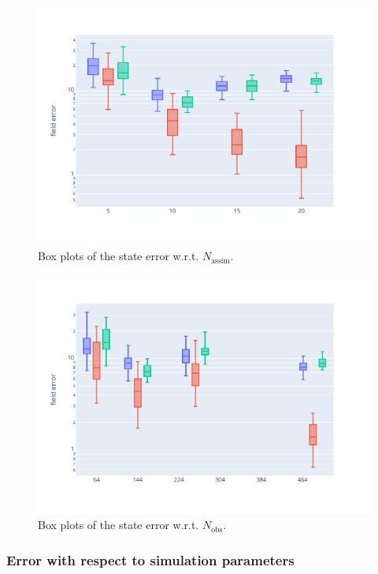 \begin{figure}[htbp]
	\centering
	\includegraphics[width=0.6\linewidth]{./images/app2d/MSE_na_box.pdf}
	\captionsetup{labelformat=empty}
	\caption{Box plots of the state error w.r.t. $N_{\text{assim}}$.}

	\label{fig:na}
\end{figure}

\begin{figure}[htbp]
	\captionsetup{labelformat=empty}
	\centering
	\includegraphics[width=0.6\linewidth]{./images/app2d/MSE_nobs_box.pdf}
	\caption{Box plots of the state error w.r.t. $N_{\text{obs}}$.}

	\label{fig:nobs}

	\label{fig:assim_params}
\end{figure}

\subsubsection{Error with respect to simulation parameters}

